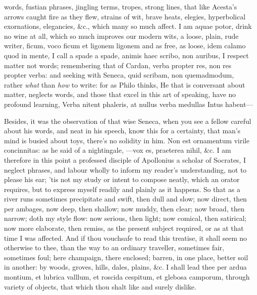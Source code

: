 {words, fustian phrases, jingling terms, tropes, strong lines, that like
Acesta's arrows caught fire as they flew, strains of wit, brave
heats, elegies, hyperbolical exornations, elegancies, \&c., which many
so much affect. I am aquae potor, drink no wine at all, which so
much improves our modern wits, a loose, plain, rude writer, ficum, voco
ficum et ligonem ligonem and as free, as loose, idem calamo quod in
mente, I call a spade a spade, animis haec scribo, non auribus, I
respect matter not words; remembering that of Cardan, verba propter
res, non res propter verba: and seeking with Seneca, quid scribam, non
quemadmodum, rather \emph{what} than \emph{how} to write: for as Philo thinks,
He that is conversant about matter, neglects words, and those that
excel in this art of speaking, have no profound learning,
Verba nitent phaleris, at nullus verba medullas
Intus habent---

Besides, it was the observation of that wise Seneca, when you see
a fellow careful about his words, and neat in his speech, know this for
a certainty, that man's mind is busied about toys, there's no solidity
in him. Non est ornamentum virile concinnitas: as he said of a
nightingale, ---vox es, praeterea nihil, \&c. I am therefore in this
point a professed disciple of Apollonius a scholar of Socrates, I
neglect phrases, and labour wholly to inform my reader's understanding,
not to please his ear; 'tis not my study or intent to compose neatly,
which an orator requires, but to express myself readily and plainly as
it happens. So that as a river runs sometimes precipitate and swift,
then dull and slow; now direct, then per ambages, now deep, then
shallow; now muddy, then clear; now broad, then narrow; doth my style
flow: now serious, then light; now comical, then satirical; now more
elaborate, then remiss, as the present subject required, or as at that
time I was affected. And if thou vouchsafe to read this treatise, it
shall seem no otherwise to thee, than the way to an ordinary traveller,
sometimes fair, sometimes foul; here champaign, there enclosed; barren,
in one place, better soil in another: by woods, groves, hills, dales,
plains, \&c. I shall lead thee per ardua montium, et lubrica valllum, et
roscida cespitum, et glebosa camporum, through variety of objects,
that which thou shalt like and surely dislike.

}
